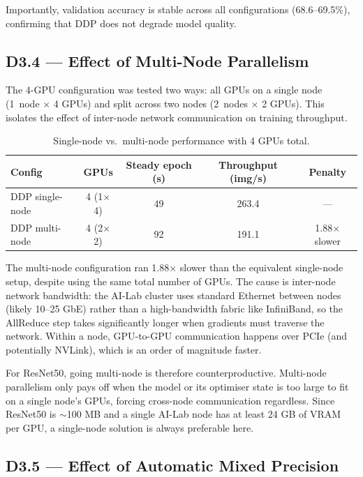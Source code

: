 Importantly, validation accuracy is stable across all configurations
(68.6–69.5\%), confirming that DDP does not degrade model quality.

\subsection{D3.4 — Effect of Multi-Node Parallelism}

The 4-GPU configuration was tested two ways: all GPUs on a single node
(1~node $\times$ 4 GPUs) and split across two nodes (2~nodes $\times$
2 GPUs). This isolates the effect of inter-node network communication on
training throughput.

\begin{table}[h]
\centering
\caption{Single-node vs.\ multi-node performance with 4 GPUs total.}
\label{tab:multinode}
\begin{tabular}{lcccc}
\toprule
\textbf{Config} & \textbf{GPUs} & \textbf{Steady epoch (s)}
  & \textbf{Throughput (img/s)} & \textbf{Penalty} \\
\midrule
DDP single-node & 4 (1$\times$4) & 49 & 263.4 & — \\
DDP multi-node  & 4 (2$\times$2) & 92 & 191.1 & 1.88$\times$ slower \\
\bottomrule
\end{tabular}
\end{table}

The multi-node configuration ran 1.88$\times$ slower than the equivalent
single-node setup, despite using the same total number of GPUs.
The cause is inter-node network bandwidth: the AI-Lab cluster uses standard
Ethernet between nodes (likely 10–25 GbE) rather than a high-bandwidth
fabric like InfiniBand, so the AllReduce step takes significantly longer
when gradients must traverse the network. Within a node, GPU-to-GPU
communication happens over PCIe (and potentially NVLink), which is an
order of magnitude faster.

For ResNet50, going multi-node is therefore counterproductive.
Multi-node parallelism only pays off when the model or its optimiser state
is too large to fit on a single node's GPUs, forcing cross-node
communication regardless. Since ResNet50 is $\sim$100 MB and a single
AI-Lab node has at least 24 GB of VRAM per GPU, a single-node solution
is always preferable here.

\subsection{D3.5 — Effect of Automatic Mixed Precision}

